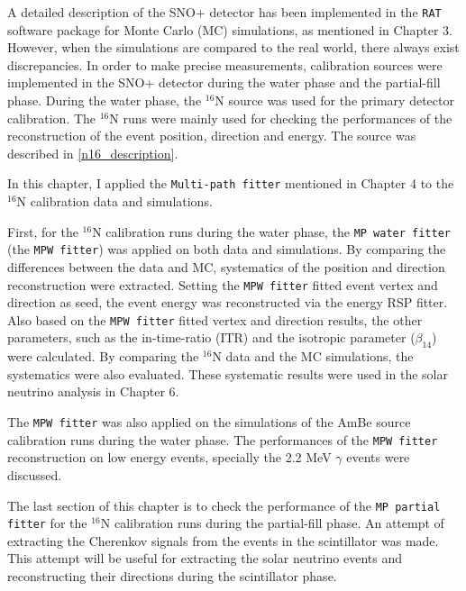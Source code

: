 A detailed description of the SNO+ detector has been implemented in the \texttt{RAT} software package for Monte Carlo (MC) simulations, as mentioned in Chapter 3. However, when the simulations are compared to the real world, there always exist discrepancies. In order to make precise measurements, calibration sources were implemented in the SNO+ detector during the water phase and the partial-fill phase. During the water phase, the $^{16}$N source was used for the primary detector calibration. The $^{16}$N runs were mainly used for checking the performances of the reconstruction of the event position, direction and energy. The source was described in \ref{n16_description}.

In this chapter, I applied the \texttt{Multi-path fitter} mentioned in Chapter 4 to the $^{16}$N calibration data and simulations.

First, for the $^{16}$N calibration runs during the water phase, the \texttt{MP water fitter} (the \texttt{MPW fitter}) was applied on both data and simulations. By comparing the differences between the data and MC, systematics of the position and direction reconstruction were extracted. Setting the \texttt{MPW fitter} fitted event vertex and direction as seed, the event energy was reconstructed via the energy RSP fitter. Also based on the \texttt{MPW fitter} fitted vertex and direction results, the other parameters, such as the in-time-ratio (ITR) and the isotropic parameter ($\beta_{14}$) were calculated. By comparing the $^{16}$N data and the MC simulations, the systematics were also evaluated. These systematic results were used in the solar neutrino analysis in Chapter 6.

The \texttt{MPW fitter} was also applied on the simulations of the AmBe source calibration runs during the water phase. The performances of the \texttt{MPW fitter} reconstruction on low energy events, specially the 2.2 MeV $\gamma$ events were discussed.

The last section of this chapter is to check the performance of the \texttt{MP partial fitter} for the $^{16}$N calibration runs during the partial-fill phase. An attempt of extracting the Cherenkov signals from the events in the scintillator was made. This attempt will be useful for extracting the solar neutrino events and reconstructing their directions during the scintillator phase. 

